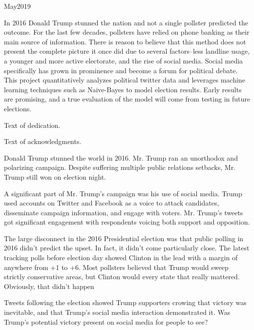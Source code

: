 \documentclass[11pt, twoside, reqno]{book}
\begin{document}
    {May}{2019}

\abstr

In 2016 Donald Trump stunned the nation and not a single pollster predicted the outcome. For the last few decades, pollsters have relied on phone banking as their main source of information. There is reason to believe that this method does not present the complete picture it once did due to several factors--less landline usage, a younger and more active electorate, and the rise of social media. Social media specifically has grown in prominence and become a forum for political debate. This project quantitatively analyzes political twitter data and leverages machine learning techniques such as Naive-Bayes to model election results. Early results are promising, and a true evaluation of the model will come from testing in future elections. 

\tableofcontents

\dedic

Text of dedication.

\acknowl

Text of acknowledgments.

\startmain


\intro
\hspace{0.2in}Donald Trump stunned the world in 2016. Mr. Trump ran an unorthodox and polarizing campaign. Despite suffering multiple public relations setbacks, Mr. Trump still won on election night.

A significant part of Mr. Trump's campaign was his use of social media. Trump used accounts on Twitter and Facebook as a voice to attack candidates, disseminate campaign information, and engage with voters. Mr. Trump's tweets got significant engagement with respondents voicing both support and opposition. 

The large disconnect in the 2016 Presidential election was that public polling in 2016 didn’t predict the upset. In fact, it didn’t come particularly close. The latest tracking polls before election day showed Clinton in the lead with a margin of anywhere from +1 to +6\cite{gallup}. Most pollsters believed that Trump would sweep strictly conservative areas, but Clinton would every state that really mattered. Obviously, that didn’t happen

Tweets following the election showed Trump supporters crowing that victory was inevitable, and that Trump’s social media interaction demonstrated it. Was Trump’s potential victory present on social media for people to see? 
\end{document}

